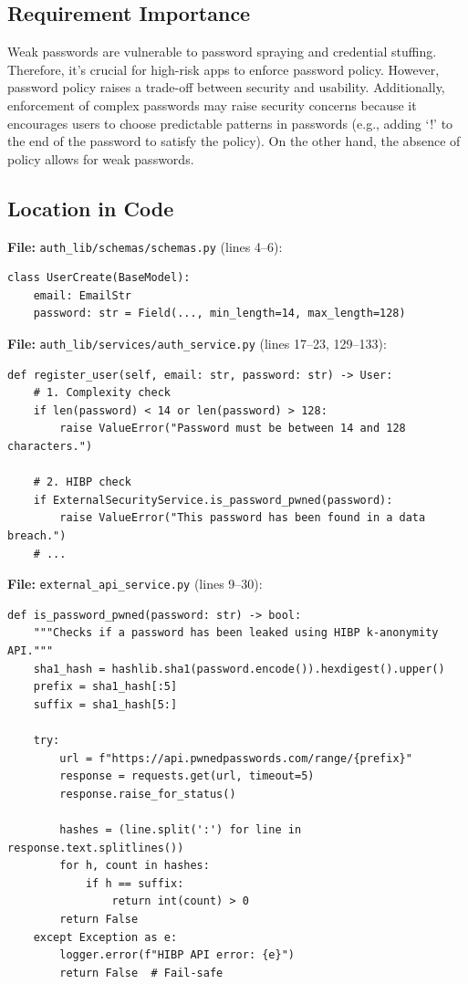 \documentclass[11pt,a4paper]{article}
\begin{document}
\subsection{Requirement Importance}
Weak passwords are vulnerable to password spraying and credential stuffing. Therefore, it's crucial for high-risk apps to enforce password policy. However, password policy raises a trade-off between security and usability. Additionally, enforcement of complex passwords may raise security concerns because it encourages users to choose predictable patterns in passwords (e.g., adding `!' to the end of the password to satisfy the policy). On the other hand, the absence of policy allows for weak passwords.

\subsection{Location in Code}

\textbf{File:} \texttt{auth\_lib/schemas/schemas.py} (lines 4--6):
\begin{lstlisting}
class UserCreate(BaseModel):
    email: EmailStr
    password: str = Field(..., min_length=14, max_length=128)
\end{lstlisting}

\textbf{File:} \texttt{auth\_lib/services/auth\_service.py} (lines 17--23, 129--133):
\begin{lstlisting}
def register_user(self, email: str, password: str) -> User:
    # 1. Complexity check
    if len(password) < 14 or len(password) > 128:
        raise ValueError("Password must be between 14 and 128 characters.")
    
    # 2. HIBP check
    if ExternalSecurityService.is_password_pwned(password):
        raise ValueError("This password has been found in a data breach.")
    # ...
\end{lstlisting}

\textbf{File:} \texttt{external\_api\_service.py} (lines 9--30):
\begin{lstlisting}
def is_password_pwned(password: str) -> bool:
    """Checks if a password has been leaked using HIBP k-anonymity API."""
    sha1_hash = hashlib.sha1(password.encode()).hexdigest().upper()
    prefix = sha1_hash[:5]
    suffix = sha1_hash[5:]
    
    try:
        url = f"https://api.pwnedpasswords.com/range/{prefix}"
        response = requests.get(url, timeout=5)
        response.raise_for_status()
        
        hashes = (line.split(':') for line in response.text.splitlines())
        for h, count in hashes:
            if h == suffix:
                return int(count) > 0
        return False
    except Exception as e:
        logger.error(f"HIBP API error: {e}")
        return False  # Fail-safe
\end{lstlisting}
\end{document}
